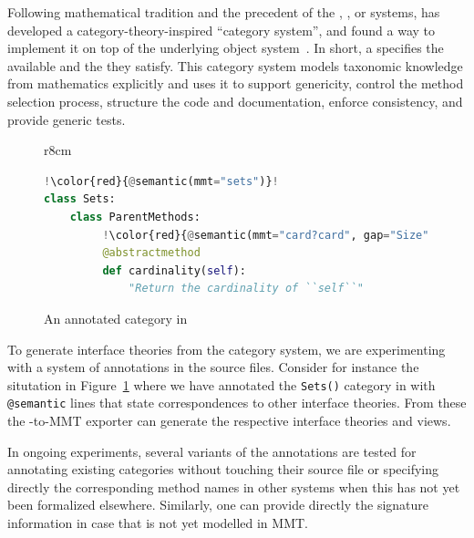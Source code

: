 Following mathematical tradition and the precedent of the \Axiom,
\Fricas, or \MuPAD systems, \Sage has developed a
category-theory-inspired ``category system'', and found a way to
implement it on top of the underlying \Python object
system~\cite{Sage,Sage.Categories}. In short, a  specifies
the available  and the  they satisfy.
%
This category system models taxonomic knowledge from mathematics
explicitly and uses it to support genericity, control the method
selection process, structure the code and documentation, enforce
consistency, and provide generic tests.

\begin{figure}r{8cm}\vspace*{-2.5em}
\begin{lstlisting}[language=Python,escapechar=!]
!\color{red}{@semantic(mmt="sets")}!
class Sets:
    class ParentMethods:
         !\color{red}{@semantic(mmt="card?card", gap="Size")}!
         @abstractmethod
         def cardinality(self):
             "Return the cardinality of ``self``"
\end{lstlisting}
\vspace*{-.5em}
\caption{An annotated category in \Sage}\label{fig:anncat}\vspace*{-1.5em}
\end{figure}
To generate interface theories from the \Sage category system, we are experimenting with a
system of annotations in the \Sage source files. Consider for instance the situtation in
Figure~\ref{fig:anncat} where we have annotated the \texttt{Sets()} category in \Sage
with \texttt{@semantic} lines that state correspondences to other interface theories. From
these the \Sage-to-MMT exporter can generate the respective interface theories and views.

In ongoing experiments, several variants of the annotations are tested
for annotating existing
categories without touching their source file or specifying directly the corresponding
method names in other systems when this has not yet been formalized elsewhere. Similarly,
one can provide directly the signature information in case that is not yet modelled in MMT.


